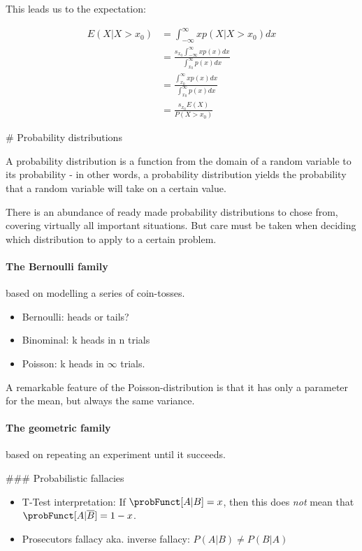 This leads us to the expectation:

\begin{equation}
    \begin{aligned}
        E(X | X > x_0)  &= \int_{-\infty}^\infty x p(X | X > x_0) dx \\
                        &= \frac{ s_{x_0} \int_{-\infty}^\infty x p(x) dx }{ \int_{x_0}^\infty p(x) dx } \\
                        &= \frac{ \int_{x_0}^\infty x p(x) dx }{ \int_{x_0}^\infty p(x) dx } \\
                        &= \frac{ s_{x_0} E(X) }{ P(X > x_0) } 
    \end{aligned}
\end{equation}


# Probability distributions

A probability distribution is a function from the domain of a random variable to its probability - in other words, a probability distribution yields the probability that a random variable will take on a certain value. 

There is an abundance of ready made probability distributions to chose from, covering virtually all important situations. But care must be taken when deciding which distribution to apply to a certain problem. 

\paragraph{The Bernoulli family} based on modelling a series of coin-tosses.
\begin{itemize}
    \item Bernoulli: heads or tails?
    \item Binominal: k heads in n trials
    \item Poisson: k heads in $\infty$ trials. 
\end{itemize}
A remarkable feature of the Poisson-distribution is that it has only a parameter for the mean, but always the same variance.

\paragraph{The geometric family} based on repeating an experiment until it succeeds. 



### Probabilistic fallacies
\begin{itemize}
    \item T-Test interpretation: If $\probFunct[A|B] = x$, then this does \emph{not} mean that $\probFunct[A|\overline{B}] = 1 - x$.
    \item Prosecutors fallacy aka. inverse fallacy: $P(A|B) \neq P(B|A)$
\end{itemize}

